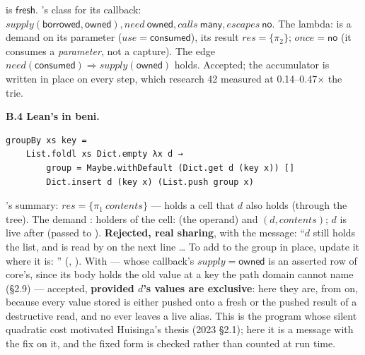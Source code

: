  is $\mathsf{fresh}$. 's class for its callback: $\mathit{supply}(\mathsf{borrowed},\allowbreak{}\mathsf{owned}),\allowbreak{}\mathit{need}\ \mathsf{owned},\allowbreak{}\mathit{calls}\ \mathsf{many},\allowbreak{}\mathit{escapes}\ \mathsf{no}$. The lambda:  is a demand on its parameter  ($\mathit{use}=\mathsf{consumed}$), its result $\mathit{res}=\{\pi _{2}\}$; $\mathit{once}=\mathsf{no}$ (it consumes a \emph{parameter}, not a capture). The edge $\mathit{need}(\mathsf{consumed})\Longrightarrow \mathit{supply}(\mathsf{owned})$ holds. Accepted; the accumulator is written in place on every step, which research 42 measured at 0.14–0.47× the trie.

\textbf{B.4 Lean's  in beni.}

\begin{Verbatim}
groupBy xs key =
    List.foldl xs Dict.empty λx d →
        group = Maybe.withDefault (Dict.get d (key x)) []
        Dict.insert d (key x) (List.push group x)
\end{Verbatim}

's summary: $\mathit{res}=\{\pi _{1}\ \mathit{contents}\}$ —  holds a cell that $d$ also holds (through the tree). The demand : holders of the cell:  (the operand) and $(d,\allowbreak{}\mathit{contents})$; $d$ is live after (passed to ). \textbf{Rejected, real sharing}, with the message: “$d$ still holds the list, and is read by  on the next line … To add to the group in place, update it where it is: ” (, ). With  — whose callback's $\mathit{supply}=\mathsf{owned}$ is an asserted row of core's, since its body  holds the old value at a key the path domain cannot name (§2.9) — accepted, \textbf{provided $d$'s values are exclusive}: here they are, from  on, because every value stored is either \code{[ x ]} pushed onto a fresh \code{[]} or the pushed result of a destructive read, and no  ever leaves a live alias. This is the program whose silent quadratic cost motivated Huisinga's thesis (2023 §2.1); here it is a message with the fix on it, and the fixed form is checked rather than counted at run time.
